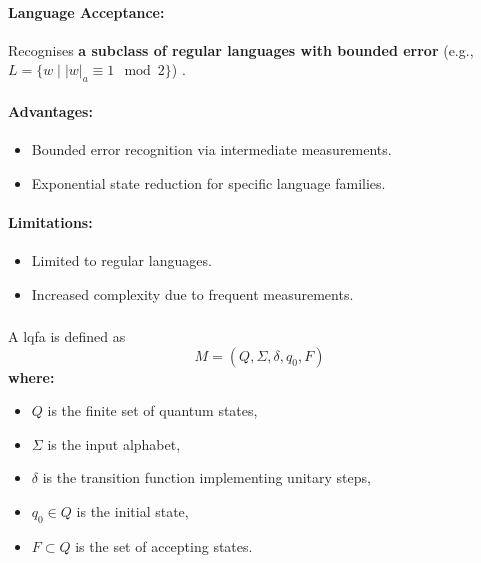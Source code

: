 \paragraph{Language Acceptance:}  
Recognises \textbf{a subclass of regular languages with bounded error} (e.g., \( L = \{w \mid |w|_a \equiv 1 \mod 2\} \)) \cite{ambainis1998}.

\paragraph{Advantages:}
\begin{itemize}
    \item Bounded error recognition via intermediate measurements.
    \item Exponential state reduction for specific language families.
\end{itemize}

\paragraph{Limitations:}
\begin{itemize}
    \item Limited to regular languages.
    \item Increased complexity due to frequent measurements.
\end{itemize}

\subsubsection{}
\label{subsec:lqfa}
\begin{definition}
A \gls{lqfa} is defined as 
\[
M = (Q, \Sigma, \delta, q_0, F)
\]
\textbf{where:}
\begin{itemize}
    \item \( Q \) is the finite set of quantum states,
    \item \( \Sigma \) is the input alphabet,
    \item \( \delta \) is the transition function implementing unitary steps,
    \item \( q_0 \in Q \) is the initial state,
    \item \( F \subset Q \) is the set of accepting states.
\end{itemize}
\end{definition}

